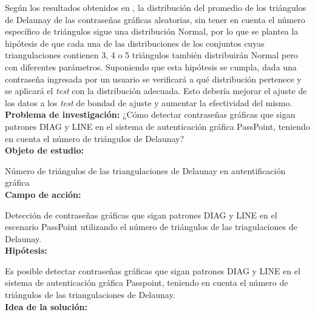 \documentclass[12pt]{report}
\begin{document}
	
	Según los resultados obtenidos en \cite{13}, la distribución del promedio de los triángulos de  Delaunay de las contraseñas gráficas aleatorias, sin tener en cuenta el número específico de triángulos sigue una distribución Normal, por lo que se plantea la hipótesis de que cada una de las distribuciones de los conjuntos cuyas triangulaciones contienen 3, 4 o 5 triángulos también distribuirán Normal pero con diferentes parámetros. Suponiendo que esta hipótesis se cumpla, dada una contraseña ingresada por un usuario se verificará a qué distribución pertenece y se aplicará el \textit{test} con la distribución adecuada. Esto debería mejorar el ajuste de los datos a los \textit{test} de bondad de ajuste y aumentar la efectividad del mismo.\\
	
\large{\textbf{Problema de investigación:}}	
\normalsize{¿Cómo  detectar contraseñas gráficas que sigan patrones DIAG y LINE  en el sistema de autenticación gráfica PassPoint, teniendo en cuenta el número de triángulos de Delaunay?}\\
	
	\large{\textbf{Objeto de estudio:}}
	
	\normalsize{Número de triángulos de las  triangulaciones de Delaunay  en autentificación gráfica}\\
	
		   
	\large{\textbf{Campo de acción:}}
	
	\normalsize{Detección de contraseñas gráficas que sigan patrones DIAG y LINE en el escenario PassPoint   utilizando  el número de triángulos de las triagulaciones de Delaunay}.\\
	 
	\large{\textbf{Hipótesis:}}

	\normalsize{Es posible detectar contraseñas gráficas que sigan patrones DIAG y LINE en el sistema de autenticación gráfica Passpoint, teniendo en cuenta el número de triángulos  de las triangulaciones de Delaunay}.\\
		
	
	\large{\textbf{Idea de la solución:}}
	
\end{document}
